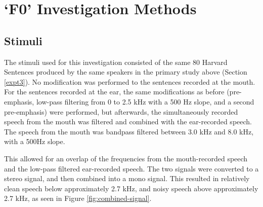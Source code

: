

\section{`F0' Investigation Methods}
\label{F0-methods}

\subsection{Stimuli}\label{F0-stimuli}

The stimuli used for this investigation consisted of the same 80 Harvard Sentences produced by the same speakers in the primary study above (Section \ref{expt3}).
No modification was performed to the sentences recorded at the mouth.  For the sentences recorded at the ear, the same modifications as before (pre-emphasis, low-pass filtering from 0 to 2.5 kHz with a 500 Hz slope, and a second pre-emphasis) were performed, but afterwards, the simultaneously recorded speech from the mouth was filtered and combined with the ear-recorded speech.  The speech from the mouth was bandpass filtered between 3.0 kHz and 8.0 kHz, with a 500Hz slope.  

This allowed for an overlap of the frequencies from the mouth-recorded speech and the low-pass filtered ear-recorded speech.  The two signals were converted to a stereo signal, and then combined into a mono signal.  This resulted in relatively clean speech below approximately 2.7 kHz, and noisy speech above approximately 2.7 kHz, as seen in Figure \ref{fig:combined-signal}.

